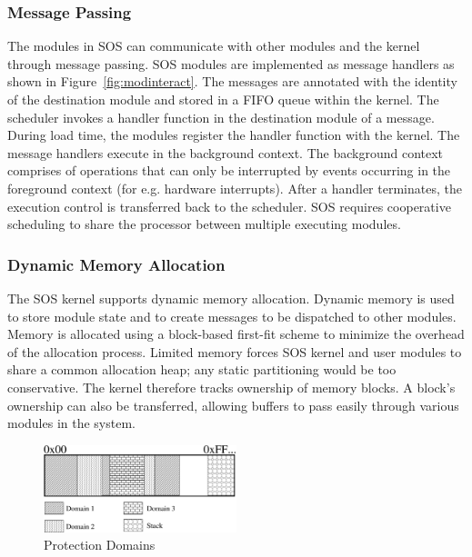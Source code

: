\subsubsection{Message Passing}
%
The modules in SOS can communicate with other modules and the kernel
through message passing.
%
SOS modules are implemented as message handlers as shown in
Figure~\ref{fig:modinteract}.
%
The messages are annotated with the identity of the destination module
and stored in a FIFO queue within the kernel.
%
The scheduler invokes a handler function in the destination module of
a message.
%
During load time, the modules register the handler function with
the kernel.
%
%
The message handlers execute in the background context.
%
The background context comprises of operations that can only be
interrupted by events occurring in the foreground context (for
e.g. hardware interrupts).
%
%
After a handler terminates, the execution control is transferred back
to the scheduler.
%
SOS requires cooperative scheduling to share the processor between
multiple executing modules.
%
\subsubsection{Dynamic Memory Allocation}
% 
The SOS kernel supports dynamic memory allocation.
% 
Dynamic memory is used to store module state and to create messages to
be dispatched to other modules. 
% 
Memory is allocated using a block-based first-fit scheme to minimize
the overhead of the allocation process.
% 
Limited memory forces SOS kernel and user modules to share a common
allocation heap; any static partitioning would be too conservative.
% 
% 
The kernel therefore tracks ownership of memory blocks.
% 
A block's ownership can also be transferred, allowing
% 
buffers to pass easily through various modules in the system.
% 
\begin{figure}[htbp]
  \centering
  \includegraphics[height = 1.0in,
  keepaspectratio=true]{figures/domains.eps} 
  \caption{Protection Domains}
  \label{fig:prot_domains}
\end{figure}
%
